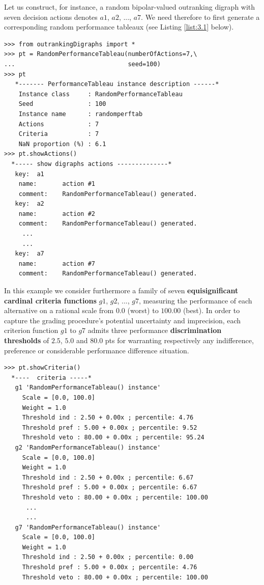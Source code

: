 Let us construct, for instance, a random bipolar-valued outranking digraph with seven decision actions denotes $a1$, $a2$, ..., $a7$. We need therefore to first generate a corresponding random performance tableaux (see Listing \ref{list:3.1} below).

\begin{lstlisting}[caption={Generating a random performance tableau},label=list:3.1]
>>> from outrankingDigraphs import *
>>> pt = RandomPerformanceTableau(numberOfActions=7,\
...                               seed=100)   
>>> pt
   *------- PerformanceTableau instance description ------*
    Instance class     : RandomPerformanceTableau
    Seed               : 100
    Instance name      : randomperftab
    Actions            : 7
    Criteria           : 7
    NaN proportion (%) : 6.1
>>> pt.showActions()
  *----- show digraphs actions --------------*
   key:  a1
    name:       action #1
    comment:    RandomPerformanceTableau() generated.
   key:  a2
    name:       action #2
    comment:    RandomPerformanceTableau() generated.
     ...
     ...
   key:  a7
    name:       action #7
    comment:    RandomPerformanceTableau() generated.
\end{lstlisting}

In this example we consider furthermore a family of seven {\bf equisignificant cardinal criteria functions} $g1$, $g2$, ..., $g7$, measuring the performance of each alternative on a rational scale from $0.0$ (worst) to $100.00$ (best). In order to capture the grading procedure's potential uncertainty and imprecision, each criterion function $g1$ to $g7$ admits three performance {\bf discrimination thresholds} of $2.5$, $5.0$ and $80.0$ pts for warranting respectively any indifference, preference or considerable performance difference situation.

\begin{lstlisting}[caption={Inspecting the performance criteria},label=list:3.2]
>>> pt.showCriteria()
  *----  criteria -----*
   g1 'RandomPerformanceTableau() instance'
     Scale = [0.0, 100.0]
     Weight = 1.0
     Threshold ind : 2.50 + 0.00x ; percentile: 4.76
     Threshold pref : 5.00 + 0.00x ; percentile: 9.52
     Threshold veto : 80.00 + 0.00x ; percentile: 95.24
   g2 'RandomPerformanceTableau() instance'
     Scale = [0.0, 100.0]
     Weight = 1.0
     Threshold ind : 2.50 + 0.00x ; percentile: 6.67
     Threshold pref : 5.00 + 0.00x ; percentile: 6.67
     Threshold veto : 80.00 + 0.00x ; percentile: 100.00
      ...
      ...
   g7 'RandomPerformanceTableau() instance'
     Scale = [0.0, 100.0]
     Weight = 1.0
     Threshold ind : 2.50 + 0.00x ; percentile: 0.00
     Threshold pref : 5.00 + 0.00x ; percentile: 4.76
     Threshold veto : 80.00 + 0.00x ; percentile: 100.00
\end{lstlisting}

